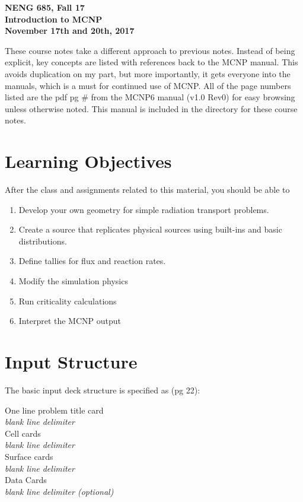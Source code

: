 \documentclass[12pt]{article}
\begin{document}
\begin{center}
{\bf NENG 685, Fall 17 \\
Introduction to MCNP\\
November 17th and 20th, 2017}
\end{center}

These course notes take a different approach to previous notes.
Instead of being explicit, key concepts are listed with references back to the MCNP manual.
This avoids duplication on my part, but more importantly, it gets everyone into the manuals, which is a must for continued use of MCNP.
All of the page numbers listed are the pdf pg \# from the MCNP6 manual (v1.0 Rev0) for easy browsing unless otherwise noted.
This manual is included in the directory for these course notes.

\section*{Learning Objectives}

After the class and assignments related to this material, you should be able to 
\begin{enumerate}
  \item Develop your own geometry for simple radiation transport problems.
  \item Create a source that replicates physical sources using built-ins and basic distributions.
  \item Define tallies for flux and reaction rates.
  \item Modify the simulation physics
  \item Run criticality calculations
  \item Interpret the MCNP output
\end{enumerate}

\section*{Input Structure}

The basic input deck structure is specified as (pg 22):

One line problem title card \\
\textit{blank line delimiter} \\
Cell cards \\
\textit{blank line delimiter} \\
Surface cards \\
\textit{blank line delimiter} \\
Data Cards \\
\textit{blank line delimiter (optional)} \\
\end{document}
